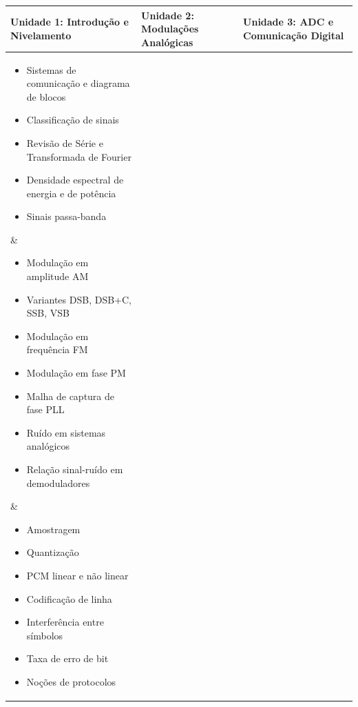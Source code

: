 \documentclass[11pt,a4paper]{article}
\begin{document}
\begin{center}
\small
\begin{tabular}{|p{}|p{}|p{}|}
\hline
\textbf{Unidade 1: Introdução e Nivelamento} & \textbf{Unidade 2: Modulações Analógicas} & \textbf{Unidade 3: ADC e Comunicação Digital} \\
\hline
\parbox[t]{0.28\textwidth}{%
  \vspace{0.2em}
  \begin{itemize}[noitemsep, leftmargin=*, nosep, font=\small]
    \item Sistemas de comunicação e diagrama de blocos
    \item Classificação de sinais
    \item Revisão de Série e Transformada de Fourier
    \item Densidade espectral de energia e de potência
    \item Sinais passa-banda
  \end{itemize}
  \vspace{0.2em}
} &
\parbox[t]{0.28\textwidth}{%
  \vspace{0.2em}
  \begin{itemize}[noitemsep, leftmargin=*, nosep, font=\small]
    \item Modulação em amplitude AM
    \item Variantes DSB, DSB+C, SSB, VSB
    \item Modulação em frequência FM
    \item Modulação em fase PM
    \item Malha de captura de fase PLL
    \item Ruído em sistemas analógicos
    \item Relação sinal-ruído em demoduladores
  \end{itemize}
  \vspace{0.2em}
} &
\parbox[t]{0.28\textwidth}{%
  \vspace{0.2em}
  \begin{itemize}[noitemsep, leftmargin=*, nosep, font=\small]
    \item Amostragem
    \item Quantização
    \item PCM linear e não linear
    \item Codificação de linha
    \item Interferência entre símbolos
    \item Taxa de erro de bit
    \item Noções de protocolos
  \end{itemize}
  \vspace{0.2em}
} \\
\hline
\end{tabular}
\end{center}
\end{document}
